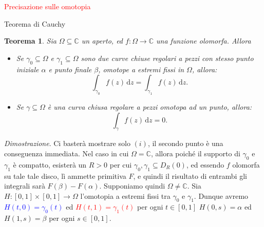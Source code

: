 \documentclass[11pt]{book}
\makeatletter
\theoremstyle{Definizione}
\theoremstyle{TeoremaProposizioneLemmaCorollarioCongettura}
\newtheorem{myteo}{Teorema}[section]
\theoremstyle{OsservazioneNotaEsempio}
\renewenvironment{proof}[1][\proofname]{\par
  \normalfont \topsep6\p@\@plus6\p@\relax
  \trivlist
  \item[\hskip\labelsep
        \itshape
    #1\@addpunct{.}]\ignorespaces
}{%
  \endtrivlist\@endpefalse
}
\renewenvironment{proof}{\textsl{Dimostrazione}.}{}
\newcommand{\C}{\mathbb{C}}
\newcommand{\Disc}[3][]{D^{#1}_{{#2}}({#3})}
\renewcommand{\d}{\mathrm{d}}
\newcommand{\dz}{\,\d z}
\makeatother
\begin{document}
\textcolor{red}{Precisazione sulle omotopia}
\begin{boxteo}{Teorema di Cauchy}
\begin{myteo}\label{teo:TeoremaDiCauchy}
Sia $\Omega\subseteq \C$ un aperto, ed $f:\Omega\longrightarrow \C$ una funzione olomorfa. Allora
\begin{itemize}
\item[$(i)$] Se $\gamma_0\subseteq \Omega$ e $\gamma_1\subseteq \Omega$ sono due curve chiuse regolari a pezzi con stesso punto iniziale $\alpha$ e punto finale $\beta$, omotope a estremi fissi in $\Omega$, allora:
$$
\int_{\gamma_0} f (z)\dz = \int_{\gamma_1} f(z)\dz.
$$
\item[$(ii)$] Se $\gamma\subseteq \Omega$ è una curva chiusa regolare a pezzi omotopa ad un punto, allora:
$$
\int_{\gamma} f(z) \dz = 0.
$$
\end{itemize}
\end{myteo}
\tcblower
\begin{proof} Ci basterà mostrare solo $(i)$, il secondo punto è una conseguenza immediata. Nel caso in cui $\Omega = \C$, allora poiché il supporto di $\gamma_0$ e $\gamma_1$ è compatto, esisterà un $R > 0$ per cui $\gamma_0,\gamma_1 \subseteq \Disc{R}{0}$, ed essendo $f$ olomorfa su tale tale disco, lì ammette primitiva $F$, e quindi il risultato di entrambi gli integrali sarà $F(\beta)-F(\alpha)$. Supponiamo quindi $\Omega \neq \C$. Sia $H:[0,1]\times[0,1]\longrightarrow \Omega$ l'omotopia a estremi fissi tra $\gamma_0$ e $\gamma_1$. Dunque avremo \textcolor{blue}{$H(t,0) = \gamma_0(t)$} ed \textcolor{red}{$H(t,1) = \gamma_1(t)$} per ogni $t\in [0,1]$ \textcolor{green!75!black}{$H(0,s) = \alpha$} ed \textcolor{yellow!75!red}{$H(1,s) = \beta$} per ogni $s\in [0,1]$.
\begin{center}
\end{center}
\end{proof}
\end{boxteo}
\end{document}
